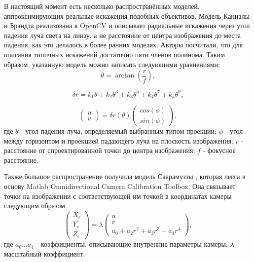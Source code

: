 В настоящий момент есть несколько распространённых моделей, аппроксимирующих реальные искажения подобных объективов. Модель Канналы и 
Брандта \cite{opencv_model} реализована в OpenCV и описывает радиальные искажения через угол падения луча света на линзу, а не расстояние  
от центра изображения до места падения, как это делалось в более ранних моделях. Авторы посчитали, что для описания типичных искажений достаточно 
пяти членов полинома. Таким образом, указанную модель можно записать следующими уравнениями:
\begin{equation}	
        \theta = \arctan(\frac{r}{f}),
        \label{eqn:kannala_theta}
\end{equation}

\begin{equation}	
    \delta r = k_1\theta + k_2\theta^3 + k_3\theta^5 + k_4\theta^7 + k_5\theta^9,
    \label{eqn:kannala_r}
\end{equation}

\begin{equation}	
    \begin{pmatrix}u\\v\end{pmatrix} = \delta r(\theta)\begin{pmatrix}cos(\phi)\\sin(\phi)\end{pmatrix},
    \label{eqn:kannala_uv}
\end{equation}
где $\theta$ - угол падения луча, определяемый выбранным типом проекции; $\phi$ - угол между горизонтом 
и проекцией падающего луча на плоскость изображения; $r$ - расстояние от спроектированной точки до центра
изображения; $f$ - фокусное расстояние.

Также большое распространение получила модель Скарамуззы \cite{scaramuzza}, которая легла в основу Matlab Omnidirectional 
Camera Calibration Toolbox. Она связывает точки на изображении с соответствующей им точкой в координатах камеры 
следующим образом
\begin{equation}	
    \begin{pmatrix}X_c\\Y_c\\Z_c\end{pmatrix} = \lambda \begin{pmatrix}u\\v\\a_0 + a_2 r^2 + a_3 r^3 + a_4 r^4\end{pmatrix},
    \label{eqn:scaramuzza}
\end{equation}
где $a_0 ... a_4$ - коэффициенты, описывающие внутренние параметры камеры; $\lambda$ - масштабный коэффициент.



